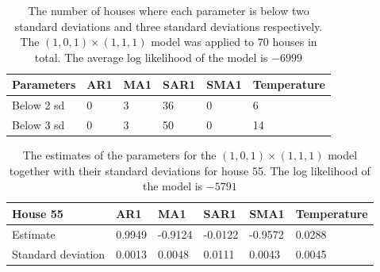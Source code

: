 \begin{table}[]
    \centering
    \begin{tabular}{|l|l|l|l|l|l|}
    \hline
    Parameters & AR1 & MA1 & SAR1 & SMA1 & Temperature \\ \hline
    Below 2 sd & 0   & 3   & 36   & 0    & 6           \\ \hline
    Below 3 sd & 0   & 3   & 50   & 0    & 14          \\ \hline
    \end{tabular}
    \caption{The number of houses where each parameter is below two standard deviations and three standard deviations respectively. The $(1,0,1)\times (1,1,1)$ model was applied to $70$ houses in total. The average log likelihood of the model is $-6999$}
    \label{tab:ParamSig_Model1}
\end{table}

\begin{table}[]
    \centering
    \begin{tabular}{|l|l|l|l|l|l|}
    \hline
    House 55           & AR1    & MA1     & SAR1    & SMA1    & Temperature \\ \hline
    Estimate           & 0.9949 & -0.9124 & -0.0122 & -0.9572 & 0.0288      \\ \hline
    Standard deviation & 0.0013 & 0.0048  & 0.0111  & 0.0043  & 0.0045      \\ \hline
    \end{tabular}
    \caption{The estimates of the parameters for the $(1,0,1)\times (1,1,1)$ model together with their standard deviations for house 55. The log likelihood of the model is $-5791$}
    \label{tab:ParamSig_House55}
 \end{table}

